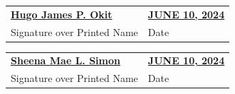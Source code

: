 \vspace{1.2cm}

\noindent
\begin{tabular}{p{} p{}}
\underline{\textbf{Hugo James P. Okit}} & \hfill \underline{\textbf{JUNE 10, 2024}} \\
Signature over Printed Name & \hfill Date \\
\end{tabular}

\vspace{1.2cm}

\noindent
\begin{tabular}{p{} p{}}
\underline{\textbf{Sheena Mae L. Simon}} & \hfill \underline{\textbf{JUNE 10, 2024}} \\
Signature over Printed Name & \hfill Date \\
\end{tabular}

